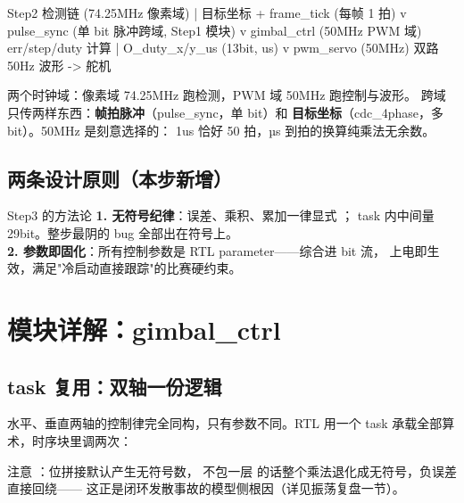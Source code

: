 \begin{Verilog}
Step2 检测链 (74.25MHz 像素域)
   |  目标坐标 + frame_tick (每帧 1 拍)
   v
pulse_sync  (单 bit 脉冲跨域, Step1 模块)
   v
gimbal_ctrl (50MHz PWM 域)  err/step/duty 计算
   |  O_duty_x/y_us (13bit, us)
   v
pwm_servo   (50MHz)         双路 50Hz 波形 -> 舵机
\end{Verilog}

两个时钟域：像素域 74.25MHz 跑检测，PWM 域 50MHz 跑控制与波形。
跨域只传两样东西：\textbf{帧拍脉冲}（pulse\_sync，单 bit）和
\textbf{目标坐标}（cdc\_4phase，多 bit）。50MHz 是刻意选择的：
1us 恰好 50 拍，µs 到拍的换算纯乘法无余数。

\subsection{两条设计原则（本步新增）}

\begin{keybox}{Step3 的方法论}
\textbf{1. 无符号纪律}：误差、乘积、累加一律显式 ；
task 内中间量 29bit。整步最阴的 bug 全部出在符号上。\\
\textbf{2. 参数即固化}：所有控制参数是 RTL parameter——综合进 bit 流，
上电即生效，满足"冷启动直接跟踪"的比赛硬约束。
\end{keybox}

\section{模块详解：gimbal\_ctrl}

\subsection{task 复用：双轴一份逻辑}

水平、垂直两轴的控制律完全同构，只有参数不同。RTL 用一个 task
 承载全部算术，时序块里调两次：


注意 ：位拼接默认产生无符号数，
不包一层  的话整个乘法退化成无符号，负误差直接回绕——
这正是闭环发散事故的模型侧根因（详见振荡复盘一节）。

